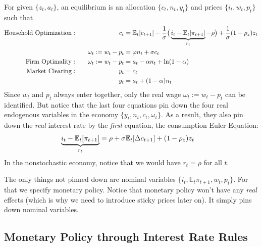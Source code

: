 \documentclass[12pt]{article}
\theoremstyle{plain}
\theoremstyle{definition}
\theoremstyle{remark}
\newcommand{\E}{\mathbb{E}}
\begin{document}
For given $\{z_t,a_t\}$, an equilibrium is an allocation
$\{c_t,n_t,y_t\}$ and prices $\{i_t,w_t,p_t\}$ such that
\begin{alignat*}{3}
  \text{Household Optimization}:&&
  \qquad\qquad
      c_{t}
      &=
      \E_t[c_{t+1}]
      -
      \frac{1}{\sigma}
      \big(
      \underbrace{%
      i_t-\E_t[\pi_{t+1}]
      }_{r_t}
      -\rho
      \big)
      +
      \frac{1}{\sigma}
      (1-\rho_z) z_t
      \\
      &&
      \omega_t:=
      w_t - p_t
      &=
      \varphi n_t
      + \sigma c_t
      \\
  \text{Firm Optimality}:&&\quad
      \omega_t:=w_t - p_t &= a_t - \alpha n_t + \ln(1-\alpha)
      \\
  \text{Market Clearing}:&&
    y_t &= c_t \\
    && y_t &= a_t + (1-\alpha)n_t
\end{alignat*}
Since $w_t$ and $p_t$ always enter together, only the real wage
$\omega_t:=w_t-p_t$ can be identified. But notice that the last four
equations pin down the four real endogenous variables in the economy
$\{y_t,n_t,c_t,\omega_t\}$. As a result, they also pin down the
\emph{real} interest rate by the \emph{first} equation, the consumption
Euler Equation:
\begin{align*}
    \underbrace{%
    i_t-\E_t[\pi_{t+1}]
    }_{r_t}
    &=
    \rho
    + \sigma \E_t[\Delta c_{t+1}]
    + (1-\rho_z) z_t
\end{align*}
In the nonstochastic economy, notice that we would have $r_t=\rho$ for
all $t$.

The only things not pinned down are nominal variables
$\{i_t,\E_t\pi_{t+1},w_t,p_t\}$. For that we specify monetary policy.
Notice that monetary policy won't have any \emph{real} effects (which is
why we need to introduce sticky prices later on). It simply pins down
nominal variables.


\subsection{Monetary Policy through Interest Rate Rules}
\end{document}
